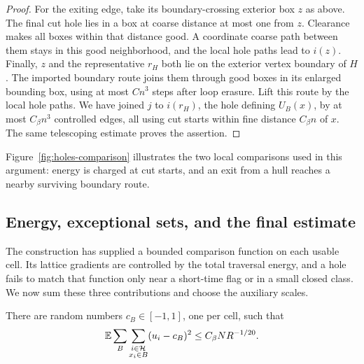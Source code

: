 \begin{proof}
For the exiting edge, take its boundary-crossing exterior box $z$
as above.  The final cut hole lies in a box at coarse distance at
most one from $z$.  Clearance makes all boxes within that distance
good.  A coordinate coarse path between them stays in this good
neighborhood, and the local hole paths lead to $i(z)$.  Finally,
$z$ and the representative $r_H$ both lie on the exterior vertex
boundary of $H$.  The imported boundary route joins them through
good boxes in its enlarged bounding box, using at most $Cn^3$
steps after loop erasure.  Lift this route by the local hole paths.
We have joined $j$ to $i(r_H)$, the hole defining $U_B(x)$,
by at most $C_\beta n^3$ controlled edges, all using cut starts
within fine distance $C_\beta n$ of $x$.
The same telescoping estimate proves the assertion.
\end{proof}

Figure~\ref{fig:holes-comparison} illustrates the two local comparisons
used in this argument: energy is charged at cut starts, and an exit
from a hull reaches a nearby surviving boundary route.

\FloatBarrier

\subsection{Energy, exceptional sets, and the final estimate}

The construction has supplied a bounded comparison function on each
usable cell.  Its lattice gradients are controlled by the total
traversal energy, and a hole fails to match that function only near a
short-time flag or in a small closed class.  We now sum these three
contributions and choose the auxiliary scales.

\begin{lemma}
\label{lem:cell-resolvent}
There are random numbers $c_B\in[-1,1]$, one per cell, such that
\begin{equation}\label{eq:cell-resolvent}
 \mathbb E\sum_B\sum_{\substack{i\in\mathcal H\\x_i\in B}}
        (u_i-c_B)^2\le C_\beta N R^{-1/20}.
\end{equation}
\end{lemma}

